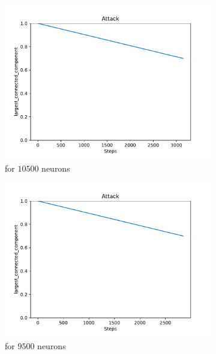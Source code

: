 \begin{figure}
	\centering
	\begin{subfigure}[b]{0.45\textwidth}
		\centering
		\includegraphics[width=\textwidth]{Images/plots_rnd/rnd_20.pdf}
		\caption{for $10500$ neurons}
	\end{subfigure}
	\hfill
	\begin{subfigure}[b]{0.45\textwidth}
		\centering
		\includegraphics[width=\textwidth]{Images/plots_rnd/rnd_22.pdf}
		\caption{for $9500$ neurons}
	\end{subfigure}
	\\ \vspace{5mm}
	\begin{subfigure}[b]{0.45\textwidth}

\end{subfigure}
\end{figure}
